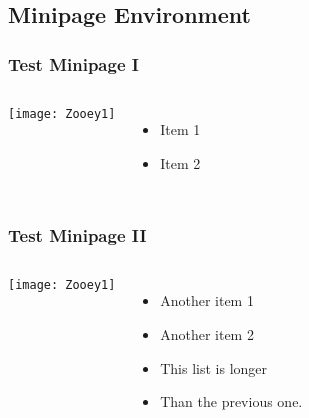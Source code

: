 \subsection{Minipage Environment}
\begin{frame}
\frametitle{Test Minipage \textrm{I}}

  \begin{columns}
      \centerline{\texttt{[image: Zooey1]}}
      \begin{minipage}[c][.6\textheight][c]{\linewidth}
        \begin{itemize}
          \item Item 1
          \item Item 2
        \end{itemize}
      \end{minipage}
  \end{columns}

\end{frame}
\begin{frame}
\frametitle{Test Minipage \textrm{II}}

  \begin{columns}
      \centerline{\texttt{[image: Zooey1]}}
      \begin{minipage}[c][.6\textheight][c]{\linewidth}
        \begin{itemize}
          \item<1-> Another item 1
          \item<2-> Another item 2
          \item<3-> This list is longer
          \item<4-> Than the previous one.
        \end{itemize}
      \end{minipage}
  \end{columns}

\end{frame}

